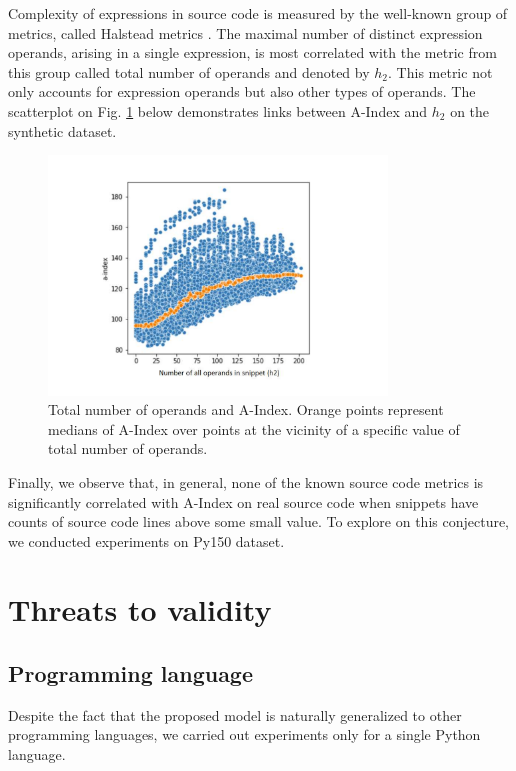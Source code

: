 \documentclass[10pt,conference]{IEEEtran}
\begin{document}
Complexity of expressions in source code is measured by the well-known group of metrics, called Halstead metrics \cite{HalsteadWiki}.
The maximal number of distinct expression operands, arising in a single expression, is most correlated with the metric from this group called total number of operands and denoted
by $h_2.$ This metric not only accounts for expression operands but also other types of operands. 
The scatterplot on Fig. \ref{a_index_vs_number_of_all_operands} below demonstrates links between {\sc A-Index} and $h_2$ on the synthetic dataset.
\begin{figure}
\begin{center}
\includegraphics[width=9cm]{a_index_vs_number_of_all_operands.pdf}
\caption{Total number of operands and {\sc A-Index}. Orange points represent medians of {\sc A-Index} over points at the vicinity of a specific value of total number of operands.}\label{a_index_vs_number_of_all_operands}
\end{center}
\end{figure}

Finally, we observe that, in general, none of the known source code metrics is significantly correlated 
with {\sc A-Index} on real source code when snippets have counts of source code lines above some small value.
To explore on this conjecture, we conducted experiments on Py150 dataset.

\section{Threats to validity}\label{threats}


\subsection{Programming language}

Despite the fact that the proposed model is naturally generalized to other programming languages,
 we carried out experiments only for a single Python language.
\end{document}
